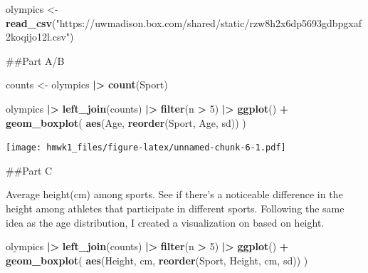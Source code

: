 \documentclass[
]{article}
\newenvironment{Shaded}{\begin{snugshade}}{\end{snugshade}}
\newcommand{\AttributeTok}[1]{\textcolor[rgb]{0.13,0.29,0.53}{#1}}
\newcommand{\DecValTok}[1]{\textcolor[rgb]{0.00,0.00,0.81}{#1}}
\newcommand{\FunctionTok}[1]{\textcolor[rgb]{0.13,0.29,0.53}{\textbf{#1}}}
\newcommand{\NormalTok}[1]{#1}
\newcommand{\OtherTok}[1]{\textcolor[rgb]{0.56,0.35,0.01}{#1}}
\newcommand{\SpecialCharTok}[1]{\textcolor[rgb]{0.81,0.36,0.00}{\textbf{#1}}}
\newcommand{\StringTok}[1]{\textcolor[rgb]{0.31,0.60,0.02}{#1}}
\begin{document}
\begin{Shaded}
\begin{Highlighting}[]
\NormalTok{olympics }\OtherTok{\textless{}{-}} \FunctionTok{read\_csv}\NormalTok{(}\StringTok{"https://uwmadison.box.com/shared/static/rzw8h2x6dp5693gdbpgxaf2koqijo12l.csv"}\NormalTok{)}
\end{Highlighting}
\end{Shaded}

\#\#Part A/B

\begin{Shaded}
\begin{Highlighting}[]
\NormalTok{counts }\OtherTok{\textless{}{-}}\NormalTok{ olympics }\SpecialCharTok{|\textgreater{}}
  \FunctionTok{count}\NormalTok{(Sport)}

\NormalTok{olympics }\SpecialCharTok{|\textgreater{}}
  \FunctionTok{left\_join}\NormalTok{(counts) }\SpecialCharTok{|\textgreater{}}
  \FunctionTok{filter}\NormalTok{(n }\SpecialCharTok{\textgreater{}} \DecValTok{5}\NormalTok{) }\SpecialCharTok{|\textgreater{}}
  \FunctionTok{ggplot}\NormalTok{() }\SpecialCharTok{+}
  \FunctionTok{geom\_boxplot}\NormalTok{(}
    \FunctionTok{aes}\NormalTok{(Age, }\FunctionTok{reorder}\NormalTok{(Sport, Age, sd))}
\NormalTok{  )}
\end{Highlighting}
\end{Shaded}

\texttt{[image: hmwk1\_files/figure-latex/unnamed-chunk-6-1.pdf]}

\#\#Part C

Average height(cm) among sports. See if there's a noticeable difference
in the height among athletes that participate in different sports.
Following the same idea as the age distribution, I created a
visualization on based on height.

\begin{Shaded}
\begin{Highlighting}[]
\NormalTok{olympics }\SpecialCharTok{|\textgreater{}}
  \FunctionTok{left\_join}\NormalTok{(counts) }\SpecialCharTok{|\textgreater{}}
  \FunctionTok{filter}\NormalTok{(n }\SpecialCharTok{\textgreater{}} \DecValTok{5}\NormalTok{) }\SpecialCharTok{|\textgreater{}}
  \FunctionTok{ggplot}\NormalTok{() }\SpecialCharTok{+}
  \FunctionTok{geom\_boxplot}\NormalTok{(}
    \FunctionTok{aes}\NormalTok{(}\StringTok{\textasciigrave{}}\AttributeTok{Height, cm}\StringTok{\textasciigrave{}}\NormalTok{, }\FunctionTok{reorder}\NormalTok{(Sport, }\StringTok{\textasciigrave{}}\AttributeTok{Height, cm}\StringTok{\textasciigrave{}}\NormalTok{, sd))}
\NormalTok{  )}
\end{Highlighting}
\end{Shaded}
\end{document}
